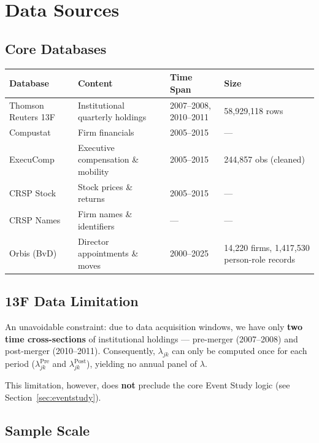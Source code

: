 \documentclass[11pt,a4paper]{article}
\begin{document}
\section{Data Sources}

\subsection{Core Databases}

\begin{longtable}{p{3.5cm}p{3cm}p{3cm}p{3cm}}
\toprule
\textbf{Database} & \textbf{Content} & \textbf{Time Span} & \textbf{Size} \\
\midrule
Thomson Reuters 13F & Institutional quarterly holdings & 2007--2008, 2010--2011 & 58,929,118 rows \\
Compustat & Firm financials & 2005--2015 & — \\
ExecuComp & Executive compensation \& mobility & 2005--2015 & 244,857 obs (cleaned) \\
CRSP Stock & Stock prices \& returns & 2005--2015 & — \\
CRSP Names & Firm names \& identifiers & — & — \\
Orbis (BvD) & Director appointments \& moves & 2000--2025 & 14,220 firms, 1,417,530 person-role records \\
\bottomrule
\end{longtable}

\subsection{13F Data Limitation}\label{sec:13flimit}

An unavoidable constraint: due to data acquisition windows, we have only {\bf two time cross-sections} of institutional holdings — pre-merger (2007--2008) and post-merger (2010--2011). Consequently, \(\lambda_{jk}\) can only be computed once for each period (\(\lambda_{jk}^{\text{Pre}}\) and \(\lambda_{jk}^{\text{Post}}\)), yielding no annual panel of \(\lambda\).

This limitation, however, does {\bf not} preclude the core Event Study logic (see Section~\ref{sec:eventstudy}).

\subsection{Sample Scale}
\end{document}
